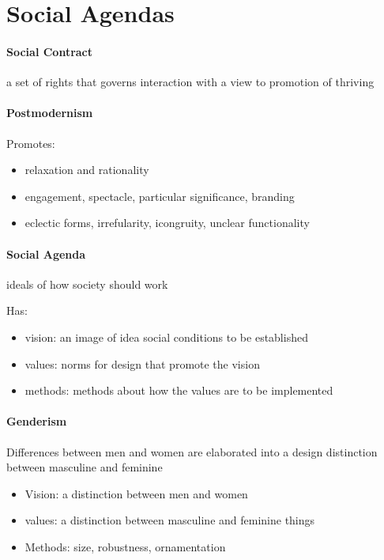 \documentclass{article}
\begin{document}
\section*{Social Agendas}
\label{sec:social_agendas}
\paragraph{Social Contract}
\label{par:social_contract}
a set of rights that governs interaction with a view to promotion of thriving

\paragraph*{Postmodernism}
\label{ssub:postmodernism}
Promotes:
\begin{itemize}
	\item relaxation and rationality
	\item engagement, spectacle, particular significance, branding
	\item eclectic forms, irrefularity, icongruity, unclear functionality
\end{itemize}

\paragraph{Social Agenda}
\label{par:social_agenda}
ideals of how society should work

Has:
\begin{itemize}
	\item vision: an image of idea social conditions to be established
	\item values: norms for design that promote the vision
	\item methods: methods about how the values are to be implemented
\end{itemize}

\paragraph{Genderism}
\label{par:genderism}
Differences between men and women are elaborated into a design distinction between masculine and feminine
\begin{itemize}
	\item Vision: a distinction between men and women
	\item values: a distinction between masculine and feminine things
	\item Methods: size, robustness, ornamentation
\end{itemize}
\end{document}
